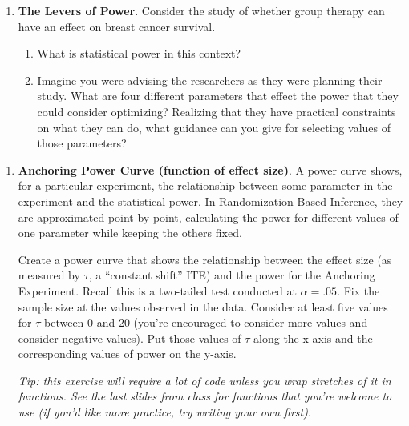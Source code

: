 \documentclass[
  letterpaper,
  DIV=11,
  numbers=noendperiod]{scrartcl}
\providecommand{\tightlist}{%
  \setlength{\itemsep}{0pt}\setlength{\parskip}{0pt}}
\begin{document}
\begin{enumerate}
\def\labelenumi{\arabic{enumi}.}
\setcounter{enumi}{2}
\item
  \textbf{The Levers of Power}. Consider the study of whether group
  therapy can have an effect on breast cancer survival.

  \begin{enumerate}
  \def\labelenumii{\alph{enumii}.}
  \tightlist
  \item
    What is statistical power in this context?
  \item
    Imagine you were advising the researchers as they were planning
    their study. What are four different parameters that effect the
    power that they could consider optimizing? Realizing that they have
    practical constraints on what they can do, what guidance can you
    give for selecting values of those parameters?
  \end{enumerate}
\end{enumerate}

\newpage{}

\begin{enumerate}
\def\labelenumi{\arabic{enumi}.}
\setcounter{enumi}{3}
\item
  \textbf{Anchoring Power Curve (function of effect size)}. A power
  curve shows, for a particular experiment, the relationship between
  some parameter in the experiment and the statistical power. In
  Randomization-Based Inference, they are approximated point-by-point,
  calculating the power for different values of one parameter while
  keeping the others fixed.

  Create a power curve that shows the relationship between the effect
  size (as measured by \(\tau\), a ``constant shift'' ITE) and the power
  for the Anchoring Experiment. Recall this is a two-tailed test
  conducted at \(\alpha = .05\). Fix the sample size at the values
  observed in the data. Consider at least five values for \(\tau\)
  between 0 and 20 (you're encouraged to consider more values and
  consider negative values). Put those values of \(\tau\) along the
  x-axis and the corresponding values of power on the y-axis.

  \emph{Tip: this exercise will require a lot of code unless you wrap
  stretches of it in functions. See the last slides from class for
  functions that you're welcome to use (if you'd like more practice, try
  writing your own first)}.
\end{enumerate}

\newpage{}
\end{document}
